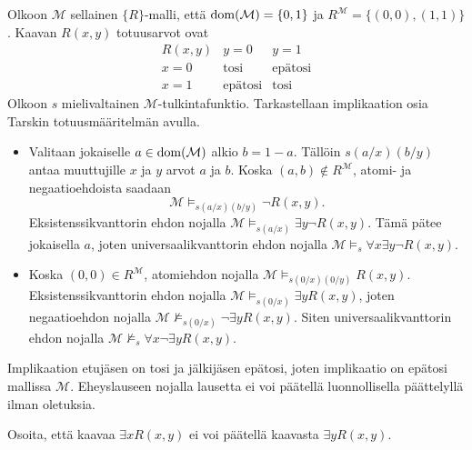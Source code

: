 \documentclass[11pt,a4paper]{amsart}
\begin{document}
\begin{solution}
  Olkoon \(\mathcal M\) sellainen \(\{R\}\)-malli, että
  \(\operatorname{dom}(\mathcal M)=\{0,1\}\) ja \(R^{\mathcal M}=\{(0,0),(1,1)\}\).
  Kaavan \(R(x,y)\) totuusarvot ovat
  \[
    \begin{array}{c|cc}
      R(x,y) & y=0 & y=1 \\
      \hline
      x=0 & \text{tosi} & \text{epätosi} \\
      x=1 & \text{epätosi} & \text{tosi}
    \end{array}
  \]
  Olkoon \(s\) mielivaltainen \(\mathcal M\)-tulkintafunktio.
  Tarkastellaan implikaation osia Tarskin totuusmääritelmän avulla.
  \begin{itemize}
    \item Valitaan jokaiselle \(a\in\operatorname{dom}(\mathcal M)\) alkio \(b=1-a\).
      Tällöin \(s(a/x)(b/y)\) antaa muuttujille
      \(x\) ja \(y\) arvot \(a\) ja \(b\). Koska \((a,b)\notin R^{\mathcal M}\),
      atomi- ja negaatioehdoista saadaan
      \[
        \mathcal M\models_{s(a/x)(b/y)}\neg R(x,y).
      \]
      Eksistenssikvanttorin ehdon nojalla
      \(\mathcal M\models_{s(a/x)}\exists y\neg R(x,y)\).
      Tämä pätee jokaisella \(a\), joten universaalikvanttorin ehdon nojalla
      \(\mathcal M\models_s\forall x\exists y\neg R(x,y)\).
    \item Koska \((0,0)\in R^{\mathcal M}\), atomiehdon nojalla
      \(\mathcal M\models_{s(0/x)(0/y)}R(x,y)\). Eksistenssikvanttorin
      ehdon nojalla \(\mathcal M\models_{s(0/x)}\exists yR(x,y)\), joten
      negaatioehdon nojalla \(\mathcal
      M\not\models_{s(0/x)}\neg\exists yR(x,y)\).
      Siten universaalikvanttorin ehdon nojalla
      \(\mathcal M\not\models_s\forall x\neg\exists yR(x,y)\).
  \end{itemize}
  Implikaation etujäsen on tosi ja jälkijäsen epätosi, joten implikaatio
  on epätosi mallissa \(\mathcal M\). Eheyslauseen nojalla lausetta ei voi
  päätellä luonnollisella päättelyllä ilman oletuksia.
\end{solution}

\begin{exercise}
  Osoita, että kaavaa \(\exists xR(x,y)\) ei voi päätellä kaavasta
  \(\exists yR(x,y)\).
\end{exercise}
\end{document}
